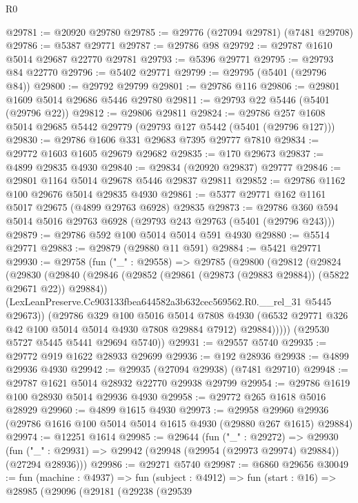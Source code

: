 \begin{lexlean}{R0}
\begin{coremodule}
@29781 := @20920 @29780
@29785 := @29776 (@27094 @29781) (@7481 @29708)
@29786 := @5387 @29771
@29787 := @29786 @98
@29792 := @29787 @1610 @5014 @29687 @22770 @29781
@29793 := @5396 @29771
@29795 := @29793 @84 @22770
@29796 := @5402 @29771
@29799 := @29795 (@5401 (@29796 @84))
@29800 := @29792 @29799
@29801 := @29786 @116
@29806 := @29801 @1609 @5014 @29686 @5446 @29780
@29811 := @29793 @22 @5446 (@5401 (@29796 @22))
@29812 := @29806 @29811
@29824 := @29786 @257 @1608 @5014 @29685 @5442 @29779 (@29793 @127 @5442 (@5401 (@29796 @127)))
@29830 := @29786 @1606 @331 @29683 @7395 @29777 @7810
@29834 := @29772 @1603 @1605 @29679 @29682
@29835 := @170 @29673
@29837 := @4899 @29835 @4930
@29840 := @29834 (@20920 @29837) @29777
@29846 := @29801 @1164 @5014 @29678 @5446 @29837 @29811
@29852 := @29786 @1162 @100 @29676 @5014 @29835 @4930
@29861 := @5377 @29771 @162 @1161 @5017 @29675 (@4899 @29763 @6928) @29835
@29873 := @29786 @360 @594 @5014 @5016 @29763 @6928 (@29793 @243 @29763 (@5401 (@29796 @243)))
@29879 := @29786 @592 @100 @5014 @5014 @591 @4930
@29880 := @5514 @29771
@29883 := @29879 (@29880 @11 @591)
@29884 := @5421 @29771
@29930 := @29758
    (fun ("_" : @29558) =>
    @29785
      (@29800
        (@29812
          (@29824
            (@29830
              (@29840
                (@29846 (@29852 (@29861 (@29873 (@29883 @29884)) (@5822 @29671 @22)) @29884))
                (LexLeanPreserve.Cc903133fbea644582a3b632cec569562.R0.__rel_31 @5445 @29673))
              (@29786
                @329
                @100
                @5016
                @5014
                @7808
                @4930
                (@6532 @29771 @326 @42 @100 @5014 @5014 @4930 @7808 @29884 @7912)
                @29884)))))
      (@29530 @5727 @5445 @5441 @29694 @5740))
@29931 := @29557 @5740
@29935 := @29772 @919 @1622 @28933 @29699
@29936 := @192 @28936
@29938 := @4899 @29936 @4930
@29942 := @29935 (@27094 @29938) (@7481 @29710)
@29948 := @29787 @1621 @5014 @28932 @22770 @29938 @29799
@29954 := @29786 @1619 @100 @28930 @5014 @29936 @4930
@29958 := @29772 @265 @1618 @5016 @28929
@29960 := @4899 @1615 @4930
@29973 := @29958
    @29960
    @29936
    (@29786 @1616 @100 @5014 @5014 @1615 @4930 (@29880 @267 @1615) @29884)
@29974 := @12251 @1614
@29985 := @29644
    (fun ("_" : @29272) =>
    @29930 (fun ("_" : @29931) => @29942 (@29948 (@29954 (@29973 @29974) @29884)) (@27294 @28936)))
@29986 := @29271 @5740
@29987 := @6860 @29656
@30049 := fun (machine : @4937) =>
  fun (subject : @4912) =>
  fun (start : @16) =>
  @28985
    (@29096
      (@29181
        (@29238
          (@29539

\end{coremodule}
\end{lexlean}
